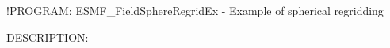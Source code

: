  
\setlength{\oldparskip}{\parskip}
\setlength{\parskip}{1.5ex}
\setlength{\oldparindent}{\parindent}
\setlength{\parindent}{0pt}
\setlength{\oldbaselineskip}{\baselineskip}
\setlength{\baselineskip}{11pt}
 
\def\bv{\begin{verbatim}}
\def\ev{\end{verbatim}}
\def\be{\begin{equation}}
\def\ee{\end{equation}}
\def\bea{\begin{eqnarray}}
\def\eea{\end{eqnarray}}
\def\bi{\begin{itemize}}
\def\ei{\end{itemize}}
\def\bn{\begin{enumerate}}
\def\en{\end{enumerate}}
\def\bd{\begin{description}}
\def\ed{\end{description}}
\def\({\left (}
\def\){\right )}
\def\[{\left [}
\def\]{\right ]}
\def\<{\left  \langle}
\def\>{\right \rangle}
\def\cI{{\cal I}}
\def\diag{\mathop{\rm diag}}
\def\tr{\mathop{\rm tr}}


 

   !PROGRAM: ESMF_FieldSphereRegridEx - Example of spherical regridding
  
{\sf DESCRIPTION:\\ }


  
  
